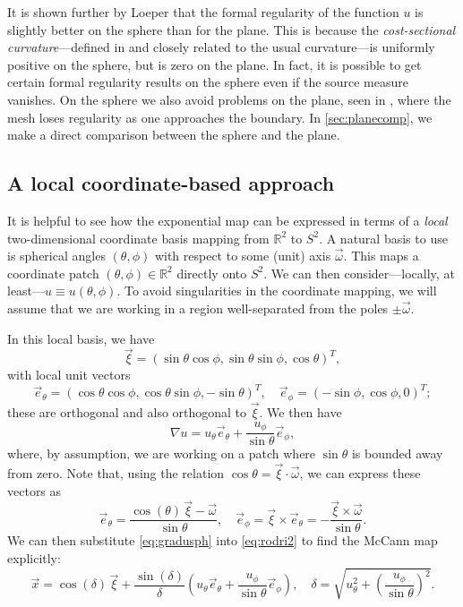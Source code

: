 \documentclass[11pt, a4paper]{scrartcl}  %
\theoremstyle{plain}
\theoremstyle{definition}
\numberwithin{equation}{section}
\begin{document}
It is shown further by Loeper that the formal regularity of the function $u$ is
slightly better on the sphere than for the plane. This is because the
\emph{cost-sectional curvature}---defined in \citet{loeper2011regularity}
and closely related to the usual curvature---is uniformly positive on
the sphere, but is zero on the plane. In fact, it is possible to get
certain formal regularity results on the sphere even if the source
measure vanishes. On the sphere we also avoid problems on the plane,
seen in \citet{budd2015geometry}, where the mesh loses regularity as one
approaches the boundary. In \cref{sec:planecomp}, we make a direct
comparison between the sphere and the plane.

\subsection{A local coordinate-based approach}
\label{ssec:otcoord}

It is helpful to see how the exponential map can be expressed in terms
of a \emph{local} two-dimensional coordinate basis mapping from
$\mathbb{R}^2$ to $S^2$. A natural basis to use is spherical angles
$(\theta, \phi)$ with respect to some (unit) axis $\vec{\omega}$. This
maps a coordinate patch $(\theta, \phi) \in \mathbb{R}^2$ directly onto
$S^2$. We can then consider---locally, at least---$u \equiv u(\theta,\phi)$.
To avoid singularities in the coordinate mapping, we will assume that we
are working in a region well-separated from the poles $\pm\vec{\omega}$.

In this local basis, we have
\begin{equation}
\vec{\xi} = (\sin\theta \cos\phi, \sin\theta \sin\phi, \cos\theta)^T,
\end{equation}
with local unit vectors
\begin{equation}
\vec{e}_\theta = (\cos\theta \cos\phi, \cos\theta \sin\phi, - \sin\theta)^T, \quad
\vec{e}_\phi = (-\sin\phi, \cos\phi,0)^T;
\end{equation}
these are orthogonal and also orthogonal to $\vec{\xi}$. We then have
\begin{equation}
\label{eq:gradusph}
\nabla u = u_\theta \vec{e}_\theta + \frac{u_\phi}{\sin\theta} \vec{e}_\phi,
\end{equation}
where, by assumption, we are working on a patch where $\sin\theta$ is
bounded away from zero. Note that, using the relation
$\cos\theta = \vec{\xi}\cdot\vec{\omega}$, we can express these vectors
as
\begin{equation}
\label{eq:unitvecs}
\vec{e}_\theta = \frac{\cos(\theta) \, \vec{\xi} - \vec{\omega}}{\sin\theta}, \quad
\vec{e}_\phi = \vec{\xi} \times \vec{e}_\theta = -\frac{\vec{\xi} \times \vec{\omega}}{\sin\theta}.
\end{equation}
We can then substitute \cref{eq:gradusph} into \cref{eq:rodri2} to find
the McCann map explicitly:
\begin{equation}
\label{eq:mccannsph}
\vec{x} = \cos(\delta)\, \vec{\xi} + \frac{\sin(\delta)}{\delta} \left(u_{\theta} \vec{e}_{\theta} + \frac{u_{\phi}}{\sin\theta} \vec{e}_{\phi} \right),
\quad \delta = \sqrt{u_{\theta}^2 + \left( \frac{u_{\phi}}{\sin\theta} \right)^2 }.
\end{equation}
\end{document}
